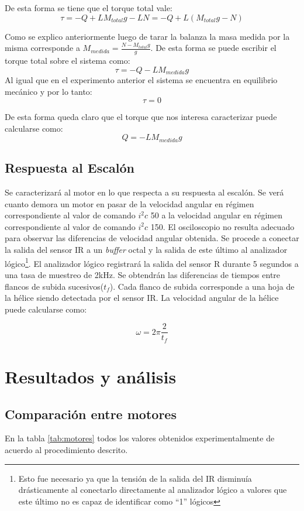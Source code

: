 \documentclass[main]{subfiles}
\begin{document}
De esta forma se tiene que el torque total vale:
$$
\tau = -Q+LM_{total}g-LN=-Q+L(M_{total}g-N)
$$

Como se explico anteriormente luego de tarar la balanza la masa medida por la misma corresponde a $M_{medida}=\frac{N-M_{total}g}{g} $. De esta forma se puede escribir el torque total sobre el sistema como:
$$
\tau=-Q-LM_{medida}g
$$
Al igual que en el experimento anterior el sistema se encuentra en equilibrio mec\'anico y por lo tanto: 
$$
\tau=0
$$  

De esta forma queda claro que el torque que nos interesa caracterizar puede calcularse como:
$$
Q=-LM_{medida}g
$$

\subsection{Respuesta al Escal\'on}
Se caracterizar\'a al motor en lo que respecta a su respuesta al escal\'on. Se ver\'a cuanto demora un motor en pasar de la velocidad angular en r\'egimen correspondiente al valor de comando $i^2c$ 50 a la velocidad angular en r\'egimen correspondiente al valor de comando $i^2c$ 150. El osciloscopio no resulta adecuado para observar las diferencias de velocidad angular obtenida. Se procede a conectar la salida del sensor IR a un \emph{buffer} octal y la salida de este \'ultimo al analizador l\'ogico\footnote{ Esto fue necesario ya que la tensi\'on de la salida del IR disminu\'ia dr\'asticamente al conectarlo directamente al analizador l\'ogico a valores que este \'ultimo no es capaz de identificar como ``1'' l\'ogicos}. El analizador l\'ogico registrar\'a la salida del sensor R durante 5 segundos a una tasa de muestreo de 2kHz. Se obtendr\'an las diferencias de tiempos entre flancos de subida sucesivos($t_f$). Cada flanco de subida corresponde a una hoja de la h\'elice siendo detectada por el sensor IR. La velocidad angular de la h\'elice puede calcularse como:

$$
\omega = 2 \pi \frac{2}{t_f}
$$ 
 
\section{Resultados y an\'alisis}

\subsection{Comparaci\'on entre motores}
\label{sec:motores} 

En la tabla \ref{tab:motores} todos los valores obtenidos experimentalmente de acuerdo al procedimiento descrito. 
\end{document}
